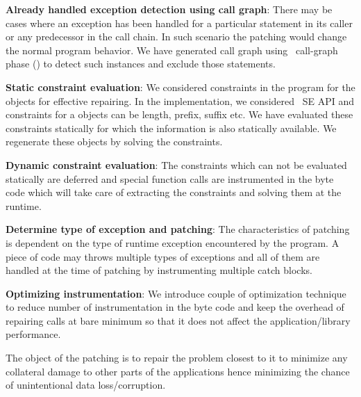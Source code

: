 {\begin{mylist}
\item \textbf{Already handled exception detection using call graph}: There may
be cases where an exception has been handled for a particular statement in its
caller or any predecessor in the call chain. In such scenario the patching would
change the normal program behavior. We have generated call graph using \soot\
call-graph phase () to detect such instances and exclude those
statements.

\item \textbf{Static constraint evaluation}: We considered constraints in the
program for the objects for effective repairing. In the implementation, we
considered \java\ SE  API and constraints for a \code{String}
objects
can be length, prefix, suffix etc. We have evaluated these constraints
statically for which the information is also statically available. We regenerate
these objects by solving the constraints.
	
\item \textbf{Dynamic constraint evaluation}: The constraints which can not be
evaluated statically are deferred and special function calls are instrumented in
the byte code which will take care of extracting the constraints and solving
them at the runtime.
	
\item \textbf{Determine type of exception and patching}: The characteristics of
patching is dependent on the type of runtime exception encountered by the
program. A piece of code may throws multiple types of exceptions and all of them
are handled at the time of patching by instrumenting multiple catch blocks.
	
\item \textbf{Optimizing instrumentation}: We introduce couple of optimization
technique to reduce number of instrumentation in the byte code and keep the
overhead of repairing calls at bare minimum so that it does not affect the
application/library performance.

\end{mylist}

The object of the patching is to repair the problem closest to it to minimize
any collateral damage to other parts of the applications hence minimizing the
chance of unintentional data loss/corruption.
}
